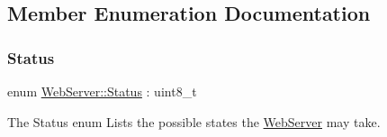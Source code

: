 \subsection{Member Enumeration Documentation}
\mbox{\label{classWebServer_a350f14f5d1522610502fb95f346e4a3c}} 
\subsubsection{\texorpdfstring{Status}{Status}}
{\footnotesize\ttfamily enum \hyperlink{classWebServer_a350f14f5d1522610502fb95f346e4a3c}{Web\+Server\+::\+Status} \+: uint8\+\_\+t}



The Status enum Lists the possible states the \hyperlink{classWebServer}{Web\+Server} may take. 

